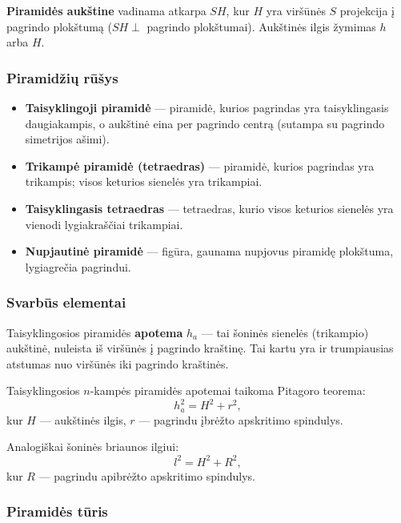 \begin{definition}
\textbf{Piramidės aukštine} vadinama atkarpa $SH$, kur $H$ yra viršūnės $S$ projekcija į pagrindo plokštumą ($SH \perp$ pagrindo plokštumai). Aukštinės ilgis žymimas $h$ arba $H$.
\end{definition}

\subsubsection*{Piramidžių rūšys}

\begin{itemize}
    \item \textbf{Taisyklingoji piramidė} --- piramidė, kurios pagrindas yra taisyklingasis daugiakampis, o aukštinė eina per pagrindo centrą (sutampa su pagrindo simetrijos ašimi).
    \item \textbf{Trikampė piramidė (tetraedras)} --- piramidė, kurios pagrindas yra trikampis; visos keturios sienelės yra trikampiai.
    \item \textbf{Taisyklingasis tetraedras} --- tetraedras, kurio visos keturios sienelės yra vienodi lygiakraščiai trikampiai.
    \item \textbf{Nupjautinė piramidė} --- figūra, gaunama nupjovus piramidę plokštuma, lygiagrečia pagrindui.
\end{itemize}

\subsubsection*{Svarbūs elementai}

\begin{definition}
Taisyklingosios piramidės \textbf{apotema} $h_a$ --- tai šoninės sienelės (trikampio) aukštinė, nuleista iš viršūnės į pagrindo kraštinę. Tai kartu yra ir trumpiausias atstumas nuo viršūnės iki pagrindo kraštinės.
\end{definition}

Taisyklingosios $n$-kampės piramidės apotemai taikoma Pitagoro teorema:
\[
    h_a^2 = H^2 + r^2,
\]
kur $H$ --- aukštinės ilgis, $r$ --- pagrindu įbrėžto apskritimo spindulys.

Analogiškai šoninės briaunos ilgiui:
\[
    l^2 = H^2 + R^2,
\]
kur $R$ --- pagrindu apibrėžto apskritimo spindulys.

\subsubsection*{Piramidės tūris}

